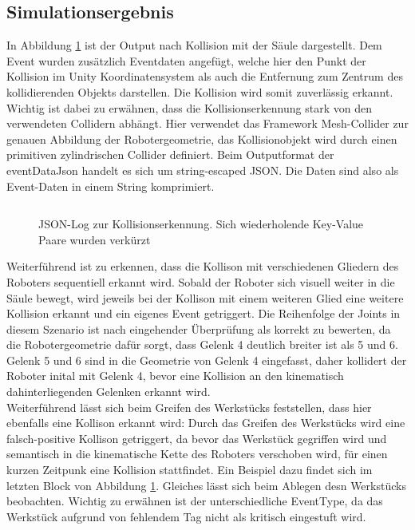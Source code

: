 \subsection{Simulationsergebnis}

In Abbildung \ref{listing:collisiondetectionerror} ist der Output nach Kollision
mit der Säule dargestellt. Dem Event wurden zusätzlich Eventdaten angefügt,
welche hier den Punkt der Kollision im Unity Koordinatensystem als auch die
Entfernung zum Zentrum des kollidierenden Objekts darstellen. Die Kollision wird
somit zuverlässig erkannt. Wichtig ist dabei zu erwähnen, dass die
Kollisionserkennung stark von den verwendeten Collidern abhängt. Hier verwendet
das Framework Mesh-Collider zur genauen Abbildung der Robotergeometrie, das
Kollisionobjekt wird durch einen primitiven zylindrischen Collider definiert.
Beim Outputformat der eventDataJson handelt es sich um string-escaped JSON. Die
Daten sind also als Event-Daten in einem String komprimiert.\\

\begin{figure}[H]
  \inputminted[fontsize=\footnotesize]{json}{code-snippets/collisiondetection.json}
  \caption{JSON-Log zur Kollisionserkennung. Sich wiederholende
    Key-Value Paare wurden
  verkürzt}
  \label{listing:collisiondetectionerror}
\end{figure}

\noindent
Weiterführend ist zu erkennen, dass die Kollison mit verschiedenen Gliedern des
Roboters sequentiell erkannt wird. Sobald der Roboter sich visuell weiter in die
Säule bewegt, wird jeweils bei der Kollison mit einem weiteren Glied eine
weitere Kollision erkannt und ein eigenes Event getriggert. Die Reihenfolge der
Joints in diesem Szenario ist nach eingehender Überprüfung als korrekt zu
bewerten, da die Robotergeometrie dafür sorgt, dass Gelenk 4 deutlich breiter
ist als 5 und 6. Gelenk 5 und 6 sind in die Geometrie von Gelenk 4 eingefasst,
daher kollidert der Roboter inital mit Gelenk 4, bevor eine Kollision an den
kinematisch dahinterliegenden Gelenken erkannt wird.\\

\noindent Weiterführend lässt sich beim Greifen des Werkstücks feststellen, dass
hier ebenfalls eine Kollison erkannt wird: Durch das Greifen des Werkstücks wird
eine falsch-positive Kollison getriggert, da bevor das Werkstück gegriffen wird
und semantisch in die kinematische Kette des Roboters verschoben wird, für einen
kurzen Zeitpunk eine Kollision stattfindet. Ein Beispiel dazu findet sich im
letzten Block von Abbildung \ref{listing:collisiondetectionerror}. Gleiches
lässt sich beim Ablegen desn Werkstücks beobachten. Wichtig zu erwähnen ist der
unterschiedliche EventType, da das Werkstück aufgrund von fehlendem Tag nicht
als kritisch eingestuft wird.

